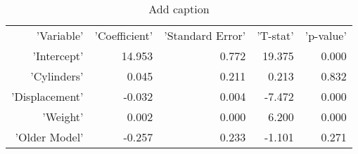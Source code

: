 \begin{table}[htbp]
  \centering
  \caption{Add caption}
    \begin{tabular}{rrrrr}
    'Variable' & 'Coefficient' & 'Standard Error' & 'T-stat' & 'p-value' \\
    'Intercept' & 14.953 & 0.772 & 19.375 & 0.000 \\
    'Cylinders' & 0.045 & 0.211 & 0.213 & 0.832 \\
    'Displacement' & -0.032 & 0.004 & -7.472 & 0.000 \\
    'Weight' & 0.002 & 0.000 & 6.200 & 0.000 \\
    'Older Model' & -0.257 & 0.233 & -1.101 & 0.271 \\
    \end{tabular}%
  \label{tab:addlabel}%
\end{table}%
